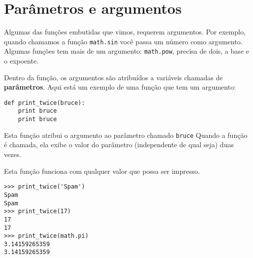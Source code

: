 \section{Parâmetros e argumentos}


\label{parametros}


Algumas das funções embutidas que vimos, requerem argumentos. Por exemplo,
quando chamamos a função {\tt math.sin} você passa um número como
argumento. Algumas funções tem mais de um argumento: {\tt math.pow},
precisa de dois, a base e o expoente.


Dentro da função, os argumentos são atribuídos a variáveis chamadas de
{\bf parâmetros}. Aqui está um exemplo de uma função que tem um argumento:


\beforeverb
\begin{verbatim}
def print_twice(bruce):
    print bruce
    print bruce
\end{verbatim}
\afterverb
%

%
Esta função atribui o argumento ao parâmetro chamado {\tt bruce} Quando a
função é chamada, ela exibe o valor do parâmetro (independente de qual seja)
duas vezes.


Esta função funciona com qualquer valor que possa ser impresso.
\beforeverb
\begin{verbatim}
>>> print_twice('Spam')
Spam
Spam
>>> print_twice(17)
17
17
>>> print_twice(math.pi)
3.14159265359
3.14159265359
\end{verbatim}
\afterverb
%

